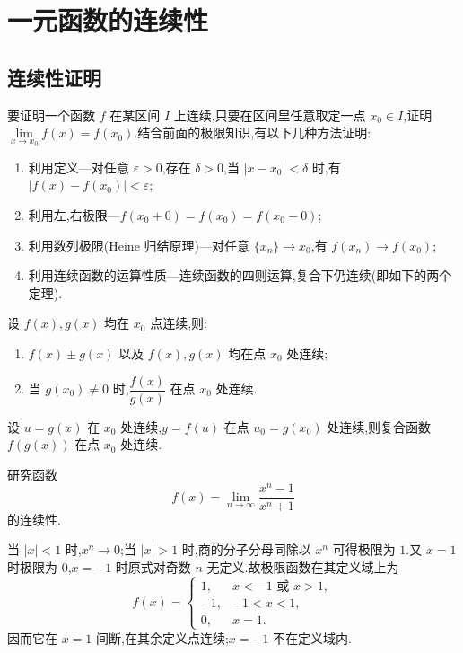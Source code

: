 \setcounter{chapter}{2}
\pagestyle{fancy}

\chapter{一元函数的连续性}


\section{连续性证明}

要证明一个函数 $f$ 在某区间 $I$ 上连续,只要在区间里任意取定一点 $x_0\in I$,证明 $\displaystyle\lim\limits_{x\to x_0}f(x)=f(x_0)$.结合前面的极限知识,有以下几种方法证明:
\begin{enumerate}
    \item 利用定义---对任意 $\varepsilon>0$,存在 $\delta>0$,当 $|x-x_0|<\delta$ 时,有 $|f(x)-f(x_0)|<\varepsilon$;
    \item 利用左,右极限---$f(x_0+0)=f(x_0)=f(x_0-0)$;
    \item 利用数列极限(Heine 归结原理)---对任意 $\{x_n\}\to x_0$,有 $f(x_n)\to f(x_0)$;
    \item 利用连续函数的运算性质---连续函数的四则运算,复合下仍连续(即如下的两个定理).
\end{enumerate}

\begin{theorem}[\markstar]
    设 $f(x),g(x)$ 均在 $x_0$ 点连续,则:
    \begin{enumerate}
        \item $f(x)\pm g(x)$ 以及 $f(x),g(x)$ 均在点 $x_0$ 处连续;
        \item 当 $g(x_0)\neq0$ 时,$\dfrac{f(x)}{g(x)}$ 在点 $x_0$ 处连续.
    \end{enumerate}
\end{theorem}

\begin{theorem}[\markstar]
    设 $u=g(x)$ 在 $x_0$ 处连续,$y=f(u)$ 在点 $u_0=g(x_0)$ 处连续,则复合函数 $f(g(x))$ 在点 $x_0$ 处连续.
\end{theorem}

\begin{example}
    研究函数
    \[
        f(x)=\lim\limits_{n\to\infty}\dfrac{x^n-1}{x^n+1}
    \]
    的连续性.
\end{example}
\exampleblank

\begin{solution}
    当 $|x|<1$ 时,$x^n\to0$;当 $|x|>1$ 时,商的分子分母同除以 $x^n$ 可得极限为 $1$.又 $x=1$ 时极限为 $0$,$x=-1$ 时原式对奇数 $n$ 无定义.故极限函数在其定义域上为
    \[
        f(x)=
        \begin{cases}
            1,  & x<-1\text{ 或 }x>1, \\
            -1, & -1<x<1,            \\
            0,  & x=1.
        \end{cases}
    \]
    因而它在 $x=1$ 间断,在其余定义点连续;$x=-1$ 不在定义域内.
\end{solution}

